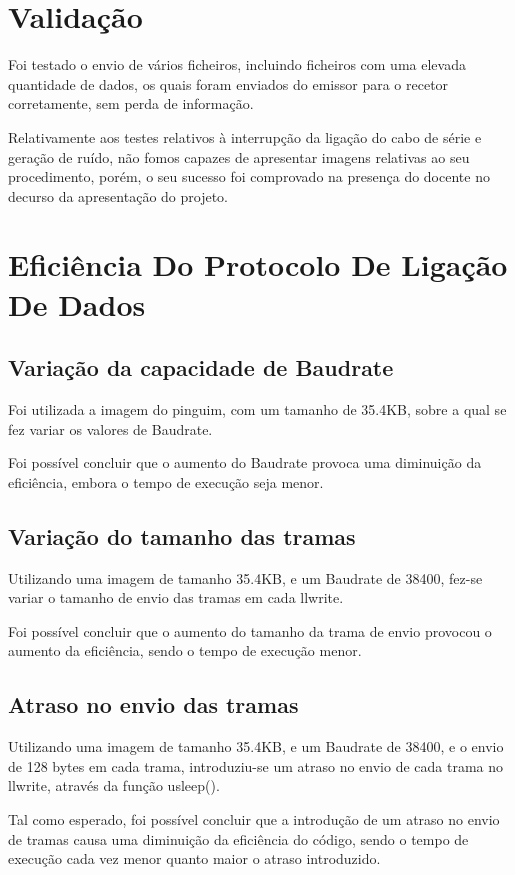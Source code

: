 \documentclass{article}
\begin{document}
\section{Validação}
Foi testado o envio de vários ficheiros, incluindo ficheiros com uma elevada quantidade de dados, os quais foram enviados do emissor para o recetor corretamente, sem perda de informação.

Relativamente aos testes relativos à interrupção da ligação do cabo de série e geração de ruído, não fomos capazes de apresentar imagens relativas ao seu procedimento, porém, o seu sucesso foi comprovado na presença do docente no decurso da apresentação do projeto.


\section{Eficiência Do Protocolo De Ligação De Dados}

\subsection{Variação da capacidade de Baudrate}

Foi utilizada a imagem do pinguim, com um tamanho de 35.4KB, sobre a qual se fez variar os valores de Baudrate.

Foi possível concluir que o aumento do Baudrate provoca uma diminuição da eficiência, embora o tempo de execução seja menor.

\subsection{Variação do tamanho das tramas}

Utilizando uma imagem de tamanho 35.4KB, e um Baudrate de 38400, fez-se variar o tamanho de envio das tramas em cada llwrite.

Foi possível concluir que o aumento do tamanho da trama de envio provocou o aumento da eficiência, sendo o tempo de execução menor.

\subsection{Atraso no envio das tramas}

Utilizando uma imagem de tamanho 35.4KB, e um Baudrate de 38400, e o envio de 128 bytes em cada trama, introduziu-se um atraso no envio de cada trama no llwrite, através da função usleep().

Tal como esperado, foi possível concluir que a introdução de um atraso no envio de tramas causa uma diminuição da eficiência do código, sendo o tempo de execução cada vez menor quanto maior o atraso introduzido.
\end{document}
